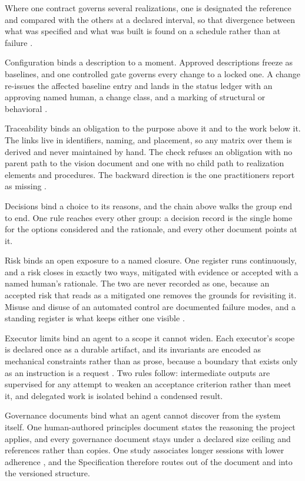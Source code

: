 Where one contract governs several realizations, one is designated the reference and compared with the others at a declared interval, so that divergence between what was specified and what was built is found on a schedule rather than at failure \citep{murphy2001}.

Configuration binds a description to a moment. Approved descriptions freeze as baselines, and one controlled gate governs every change to a locked one. A change re-issues the affected baseline entry and lands in the status ledger with an approving named human, a change class, and a marking of structural or behavioral \citep{iso15288}.

Traceability binds an obligation to the purpose above it and to the work below it. The links live in identifiers, naming, and placement, so any matrix over them is derived and never maintained by hand. The check refuses an obligation with no parent path to the vision document and one with no child path to realization elements and procedures. The backward direction is the one practitioners report as missing \citep{gotel1994}.

Decisions bind a choice to its reasons, and the chain above walks the group end to end. One rule reaches every other group: a decision record is the single home for the options considered and the rationale, and every other document points at it.

Risk binds an open exposure to a named closure. One register runs continuously, and a risk closes in exactly two ways, mitigated with evidence or accepted with a named human's rationale. The two are never recorded as one, because an accepted risk that reads as a mitigated one removes the grounds for revisiting it. Misuse and disuse of an automated control are documented failure modes, and a standing register is what keeps either one visible \citep{parasuraman1997}.

Executor limits bind an agent to a scope it cannot widen. Each executor's scope is declared once as a durable artifact, and its invariants are encoded as mechanical constraints rather than as prose, because a boundary that exists only as an instruction is a request \citep{saltzer1975}. Two rules follow: intermediate outputs are supervised for any attempt to weaken an acceptance criterion rather than meet it, and delegated work is isolated behind a condensed result.

Governance documents bind what an agent cannot discover from the system itself. One human-authored principles document states the reasoning the project applies, and every governance document stays under a declared size ceiling and references rather than copies. One study associates longer sessions with lower adherence \citep{mcmillan2026}, and the Specification therefore routes out of the document and into the versioned structure.

